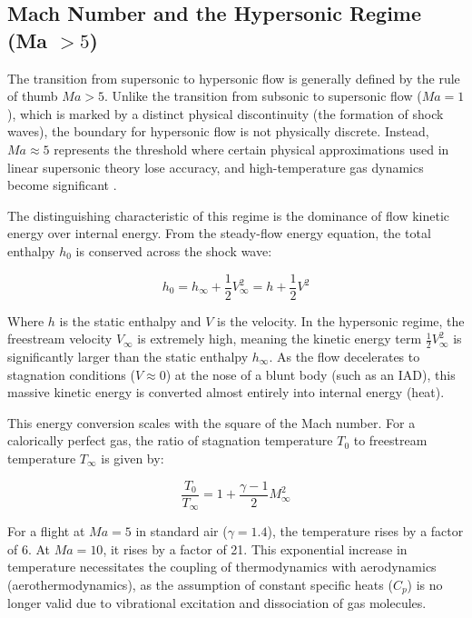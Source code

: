 \subsection{Mach Number and the Hypersonic Regime (Ma $> 5$)}

The transition from supersonic to hypersonic flow is generally defined by the rule of thumb $Ma > 5$. Unlike the transition from subsonic to supersonic flow ($Ma = 1$), which is marked by a distinct physical discontinuity (the formation of shock waves), the boundary for hypersonic flow is not physically discrete. Instead, $Ma \approx 5$ represents the threshold where certain physical approximations used in linear supersonic theory lose accuracy, and high-temperature gas dynamics become significant \cite{AndersonHypersonic}.
\par

The distinguishing characteristic of this regime is the dominance of flow kinetic energy over internal energy. From the steady-flow energy equation, the total enthalpy $h_0$ is conserved across the shock wave:

\begin{equation}
    h_0 = h_{\infty} + \frac{1}{2}V_{\infty}^2 = h + \frac{1}{2}V^2
\end{equation}

Where $h$ is the static enthalpy and $V$ is the velocity. In the hypersonic regime, the freestream velocity $V_{\infty}$ is extremely high, meaning the kinetic energy term $\frac{1}{2}V_{\infty}^2$ is significantly larger than the static enthalpy $h_{\infty}$. As the flow decelerates to stagnation conditions ($V \approx 0$) at the nose of a blunt body (such as an IAD), this massive kinetic energy is converted almost entirely into internal energy (heat).
\par
This energy conversion scales with the square of the Mach number. For a calorically perfect gas, the ratio of stagnation temperature $T_0$ to freestream temperature $T_{\infty}$ is given by:

\begin{equation}
    \frac{T_0}{T_{\infty}} = 1 + \frac{\gamma - 1}{2} M_{\infty}^2
\end{equation}
\par
For a flight at $Ma = 5$ in standard air ($\gamma = 1.4$), the temperature rises by a factor of 6. At $Ma = 10$, it rises by a factor of 21. This exponential increase in temperature necessitates the coupling of thermodynamics with aerodynamics (aerothermodynamics), as the assumption of constant specific heats ($C_p$) is no longer valid due to vibrational excitation and dissociation of gas molecules.

